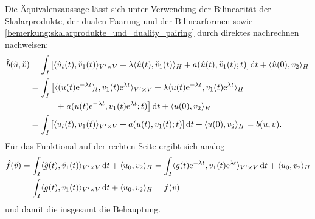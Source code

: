 \documentclass[../main.tex]{subfiles}
\begin{document}
\begin{Proposition}
\begin{Beweis}
        Die Äquivalenzaussage lässt sich unter Verwendung der Bilinearität der Skalarprodukte, der dualen Paarung und der Bilinearformen sowie \cref{bemerkung:skalarprodukte_und_duality_pairing} durch direktes nachrechnen nachweisen:
        \begin{equation}
            \begin{aligned}
                \hat{b}(\hat{u}, \check{v})
                &= \int_{I} \left[ \langle\hat{u}_{t}(t),\check{v}_{1}(t)\rangle_{V' \times V} + \lambda \langle\hat{u}(t),\check{v}_{1}(t)\rangle_{H} + a(\hat{u}(t), \check{v}_{1}(t); t) \right] \mathop{}\!\mathrm{d} t + \langle\hat{u}(0),v_{2}\rangle_{H}
                \\
                &= \int_{I} \left[ \langle(u(t)\mathrm{e}^{- \lambda t})_{t},v_{1}(t) \mathrm{e}^{\lambda t}\rangle_{V' \times V} + \lambda \langle u(t)\mathrm{e}^{- \lambda t},v_{1}(t)\mathrm{e}^{\lambda t}\rangle_{H} \right.
                \\&\qquad \quad
                \left. +\;a(u(t)\mathrm{e}^{- \lambda t}, v_{1}(t)\mathrm{e}^{\lambda t}; t) \right] \mathop{}\!\mathrm{d} t + \langle u(0),v_{2}\rangle_{H}
                \\
                &= \int_{I} \left[ \langle u_{t}(t),v_{1}(t)\rangle_{V' \times V} + a(u(t), v_{1}(t); t) \right] \mathop{}\!\mathrm{d} t + \langle u(0),v_{2}\rangle_{H}
                = b(u, v).
            \end{aligned}
        \end{equation}
        Für das Funktional auf der rechten Seite ergibt sich analog
        \begin{equation}
            \begin{aligned}
                \hat{f}(\check{v})
                &= \int_{I} \langle\hat{g}(t),\check{v}_{1}(t)\rangle_{V' \times V} \mathop{}\!\mathrm{d} t + \langle u_{0},v_{2}\rangle_{H}
                = \int_{I} \langle g(t)\mathrm{e}^{- \lambda t},v_{1}(t)\mathrm{e}^{\lambda t}\rangle_{V' \times V} \mathop{}\!\mathrm{d} t + \langle u_{0},v_{2}\rangle_{H}
                \\&= \int_{I} \langle g(t),v_{1}(t)\rangle_{V' \times V} \mathop{}\!\mathrm{d} t + \langle u_{0},v_{2}\rangle_{H}
                = f(v)
            \end{aligned}
        \end{equation}
        und damit die insgesamt die Behauptung.
    \end{Beweis}
\end{Proposition}
\end{document}
